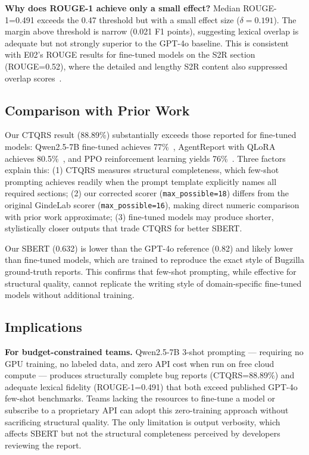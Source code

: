 \textbf{Why does ROUGE-1 achieve only a small effect?}
Median ROUGE-1=0.491 exceeds the 0.47 threshold but with a
small effect size ($\delta=0.191$). The margin above threshold
is narrow (0.021 F1 points), suggesting lexical overlap is
adequate but not strongly superior to the GPT-4o baseline.
This is consistent with E02's ROUGE results for fine-tuned
models on the S2R section (ROUGE=0.52), where the detailed
and lengthy S2R content also suppressed overlap
scores~\cite{acharya2025bugquality}.

\subsection{Comparison with Prior Work}

Our CTQRS result (88.89\%) substantially exceeds those
reported for fine-tuned models: Qwen2.5-7B fine-tuned
achieves 77\%~\cite{acharya2025bugquality}, AgentReport
with QLoRA achieves 80.5\%~\cite{choi2025agentreport},
and PPO reinforcement learning yields
76\%~\cite{yang2025ctqrsrl}. Three factors explain this:
(1) CTQRS measures structural completeness, which few-shot
prompting achieves readily when the prompt template
explicitly names all required sections; (2) our corrected
scorer (\texttt{max\_possible=18}) differs from the
original GindeLab scorer (\texttt{max\_possible=16}),
making direct numeric comparison with prior work
approximate; (3) fine-tuned models may produce shorter,
stylistically closer outputs that trade CTQRS for better
SBERT.

Our SBERT (0.632) is lower than the GPT-4o reference
(0.82) and likely lower than fine-tuned models, which
are trained to reproduce the exact style of Bugzilla
ground-truth reports. This confirms that few-shot
prompting, while effective for structural quality, cannot
replicate the writing style of domain-specific fine-tuned
models without additional training.

\subsection{Implications}

\textbf{For budget-constrained teams.}
Qwen2.5-7B 3-shot prompting --- requiring no GPU training,
no labeled data, and zero API cost when run on free cloud
compute --- produces structurally complete bug reports
(CTQRS=88.89\%) and adequate lexical fidelity
(ROUGE-1=0.491) that both exceed published GPT-4o few-shot
benchmarks. Teams lacking the resources to fine-tune a
model or subscribe to a proprietary API can adopt this
zero-training approach without sacrificing structural
quality. The only limitation is output verbosity, which
affects SBERT but not the structural completeness
perceived by developers reviewing the report.

